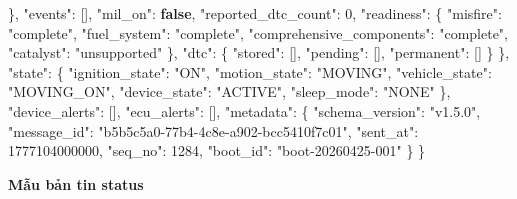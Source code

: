 \documentclass[a4paper]{extarticle}
\newenvironment{Shaded}{}{}
\newcommand{\DataTypeTok}[1]{\textcolor[rgb]{0.56,0.13,0.00}{#1}}
\newcommand{\DecValTok}[1]{\textcolor[rgb]{0.25,0.63,0.44}{#1}}
\newcommand{\FunctionTok}[1]{\textcolor[rgb]{0.02,0.16,0.49}{#1}}
\newcommand{\KeywordTok}[1]{\textcolor[rgb]{0.00,0.44,0.13}{\textbf{#1}}}
\newcommand{\OtherTok}[1]{\textcolor[rgb]{0.00,0.44,0.13}{#1}}
\newcommand{\StringTok}[1]{\textcolor[rgb]{0.25,0.44,0.63}{#1}}
\newcommand{\thesisterm}[1]{{\rmfamily #1}}
\begin{document}
\begin{Shaded}
\begin{Highlighting}[]
    \FunctionTok{\},}
    \DataTypeTok{"events"}\FunctionTok{:} \OtherTok{[]}\FunctionTok{,}
    \DataTypeTok{"mil\_on"}\FunctionTok{:} \KeywordTok{false}\FunctionTok{,}
    \DataTypeTok{"reported\_dtc\_count"}\FunctionTok{:} \DecValTok{0}\FunctionTok{,}
    \DataTypeTok{"readiness"}\FunctionTok{:} \FunctionTok{\{}
      \DataTypeTok{"misfire"}\FunctionTok{:} \StringTok{"complete"}\FunctionTok{,}
      \DataTypeTok{"fuel\_system"}\FunctionTok{:} \StringTok{"complete"}\FunctionTok{,}
      \DataTypeTok{"comprehensive\_components"}\FunctionTok{:} \StringTok{"complete"}\FunctionTok{,}
      \DataTypeTok{"catalyst"}\FunctionTok{:} \StringTok{"unsupported"}
    \FunctionTok{\},}
    \DataTypeTok{"dtc"}\FunctionTok{:} \FunctionTok{\{}
      \DataTypeTok{"stored"}\FunctionTok{:} \OtherTok{[]}\FunctionTok{,}
      \DataTypeTok{"pending"}\FunctionTok{:} \OtherTok{[]}\FunctionTok{,}
      \DataTypeTok{"permanent"}\FunctionTok{:} \OtherTok{[]}
    \FunctionTok{\}}
  \FunctionTok{\},}
  \DataTypeTok{"state"}\FunctionTok{:} \FunctionTok{\{}
    \DataTypeTok{"ignition\_state"}\FunctionTok{:} \StringTok{"ON"}\FunctionTok{,}
    \DataTypeTok{"motion\_state"}\FunctionTok{:} \StringTok{"MOVING"}\FunctionTok{,}
    \DataTypeTok{"vehicle\_state"}\FunctionTok{:} \StringTok{"MOVING\_ON"}\FunctionTok{,}
    \DataTypeTok{"device\_state"}\FunctionTok{:} \StringTok{"ACTIVE"}\FunctionTok{,}
    \DataTypeTok{"sleep\_mode"}\FunctionTok{:} \StringTok{"NONE"}
  \FunctionTok{\},}
  \DataTypeTok{"device\_alerts"}\FunctionTok{:} \OtherTok{[]}\FunctionTok{,}
  \DataTypeTok{"ecu\_alerts"}\FunctionTok{:} \OtherTok{[]}\FunctionTok{,}
  \DataTypeTok{"metadata"}\FunctionTok{:} \FunctionTok{\{}
    \DataTypeTok{"schema\_version"}\FunctionTok{:} \StringTok{"v1.5.0"}\FunctionTok{,}
    \DataTypeTok{"message\_id"}\FunctionTok{:} \StringTok{"b5b5c5a0{-}77b4{-}4c8e{-}a902{-}bcc5410f7c01"}\FunctionTok{,}
    \DataTypeTok{"sent\_at"}\FunctionTok{:} \DecValTok{1777104000000}\FunctionTok{,}
    \DataTypeTok{"seq\_no"}\FunctionTok{:} \DecValTok{1284}\FunctionTok{,}
    \DataTypeTok{"boot\_id"}\FunctionTok{:} \StringTok{"boot{-}20260425{-}001"}
  \FunctionTok{\}}
\FunctionTok{\}}
\end{Highlighting}
\end{Shaded}

\textbf{Mẫu bản tin \thesisterm{status}}
\end{document}
